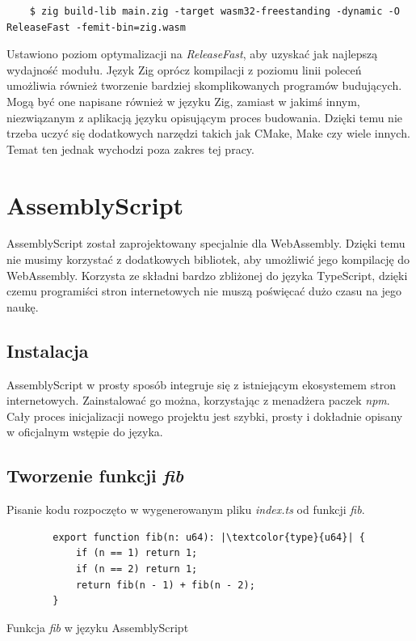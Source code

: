 \documentclass[language=polish,type=master]{aghmodern}
\begin{document}
\begin{verbatim}
    $ zig build-lib main.zig -target wasm32-freestanding -dynamic -O ReleaseFast -femit-bin=zig.wasm
\end{verbatim}

Ustawiono poziom optymalizacji na \emph{ReleaseFast}, aby uzyskać jak najlepszą wydajność modułu.
Język Zig oprócz kompilacji z poziomu linii poleceń umożliwia również tworzenie bardziej skomplikowanych programów budujących.
Mogą być one napisane również w języku Zig, zamiast w jakimś innym, niezwiązanym z aplikacją języku opisującym proces budowania.
Dzięki temu nie trzeba uczyć się dodatkowych narzędzi takich jak CMake, Make czy wiele innych.
Temat ten jednak wychodzi poza zakres tej pracy.

\section{AssemblyScript}
AssemblyScript został zaprojektowany specjalnie dla WebAssembly.
Dzięki temu nie musimy korzystać z dodatkowych bibliotek, aby umożliwić jego kompilację do WebAssembly.
Korzysta ze składni bardzo zbliżonej do języka TypeScript, dzięki czemu programiści stron internetowych nie muszą poświęcać dużo czasu na jego naukę.

\subsection{Instalacja}
AssemblyScript w prosty sposób integruje się z istniejącym ekosystemem stron internetowych.
Zainstalować go można, korzystając z menadżera paczek \emph{npm}.
Cały proces inicjalizacji nowego projektu jest szybki, prosty i dokładnie opisany w oficjalnym wstępie do języka\footnotemark{}.

\subsection{Tworzenie funkcji \emph{fib}}
Pisanie kodu rozpoczęto w wygenerowanym pliku \emph{index.ts} od funkcji \emph{fib}.

\begin{listing}[H]
    \begin{verbatim}
        export function fib(n: u64): |\textcolor{type}{u64}| {
            if (n == 1) return 1;
            if (n == 2) return 1;
            return fib(n - 1) + fib(n - 2);
        }
    \end{verbatim}
    \caption{Funkcja \emph{fib} w języku AssemblyScript}
\end{listing}
\end{document}
